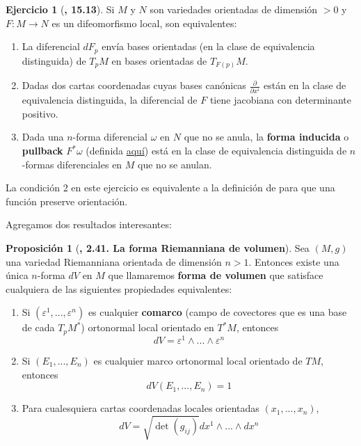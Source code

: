 \documentclass[spanish]{book}
\theoremstyle{definition}
\newtheorem*{prop}{Proposición}
\newtheorem*{ejer*}{Ejercicio}
\begin{document}
	\begin{ejer*}[\cite{Lee}\textbf{, 15.13}]
		Si $M$ y $N$ son variedades orientadas de dimensión $>0$ y ${F:M\to N}$ es un difeomorfismo local, son equivalentes:
		\begin{enumerate}
			\item La diferencial $dF_p$ envía bases orientadas (en la clase de equivalencia distinguida) de $T_pM$ en bases orientadas de $T_{F(p)}M$.
			\item Dadas dos cartas coordenadas cuyas bases canónicas $\frac{\partial}{\partial x^i}$ están en la clase de equivalencia distinguida, la diferencial de $F$ tiene jacobiana con determinante positivo.
			\item Dada una $n$-forma diferencial $\omega$ en $N$ que no se anula, la \textbf{forma inducida} o \textbf{pullback} $F^*\omega$ (definida \hyperref[pullback]{aquí}) está en la clase de equivalencia distinguida de $n$-formas diferenciales en $M$ que no se anulan.
		\end{enumerate}
	\end{ejer*}
	
	La condición 2 en este ejercicio es equivalente a la definición de \cite{DoCarmo} para que una función preserve orientación.
	
	Agregamos dos resultados interesantes:
	\begin{prop}[\cite{Lee-riem}\textbf{, 2.41. La forma Riemanniana de volumen}]
		
		Sea $(M,g)$ una variedad Riemanniana orientada de dimensión $n>1$. Entonces existe una única $n$-forma $dV$ en $M$ que llamaremos \textbf{forma de volumen} que satisface cualquiera de las siguientes propiedades equivalentes:
		
			\begin{enumerate}[label={(\arabic*)}]
			\item Si $(\varepsilon^1,...,\varepsilon^n)$ es cualquier \textbf{comarco} (campo de covectores que es una base de cada $T_pM^*$) ortonormal local orientado en $T^*M$, entonces
			\[dV=\varepsilon^1\wedge...\wedge\varepsilon^n\]
			\item Si $(E_1,...,E_n)$ es cualquier marco ortonormal local orientado de $TM$, entonces
			\[dV(E_1,...,E_n)=1\]
			\item Para cualesquiera cartas coordenadas locales orientadas $(x_1,...,x_n)$,
			$$dV=\sqrt{\det (g_{ij})}dx^1\wedge...\wedge dx^n$$
		\end{enumerate}
	\end{prop}
\end{document}
